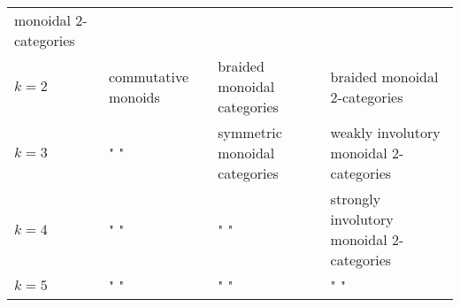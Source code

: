 \documentclass{article}
\begin{document}
\begin{longtable}[]{@{}llll@{}}
\begin{minipage}[t]{0.21\columnwidth}
monoidal 2-categories\strut
\end{minipage}\tabularnewline
\begin{minipage}[t]{0.26\columnwidth}\raggedright
\(k=2\)\strut
\end{minipage} & \begin{minipage}[t]{0.21\columnwidth}\raggedright
commutative monoids\strut
\end{minipage} & \begin{minipage}[t]{0.21\columnwidth}\raggedright
braided monoidal categories\strut
\end{minipage} & \begin{minipage}[t]{0.21\columnwidth}\raggedright
braided monoidal 2-categories\strut
\end{minipage}\tabularnewline
\begin{minipage}[t]{0.26\columnwidth}\raggedright
\(k=3\)\strut
\end{minipage} & \begin{minipage}[t]{0.21\columnwidth}\raggedright
" "\strut
\end{minipage} & \begin{minipage}[t]{0.21\columnwidth}\raggedright
symmetric monoidal categories\strut
\end{minipage} & \begin{minipage}[t]{0.21\columnwidth}\raggedright
weakly involutory monoidal 2-categories\strut
\end{minipage}\tabularnewline
\begin{minipage}[t]{0.26\columnwidth}\raggedright
\(k=4\)\strut
\end{minipage} & \begin{minipage}[t]{0.21\columnwidth}\raggedright
" "\strut
\end{minipage} & \begin{minipage}[t]{0.21\columnwidth}\raggedright
" "\strut
\end{minipage} & \begin{minipage}[t]{0.21\columnwidth}\raggedright
strongly involutory monoidal 2-categories\strut
\end{minipage}\tabularnewline
\begin{minipage}[t]{0.26\columnwidth}\raggedright
\(k=5\)\strut
\end{minipage} & \begin{minipage}[t]{0.21\columnwidth}\raggedright
" "\strut
\end{minipage} & \begin{minipage}[t]{0.21\columnwidth}\raggedright
" "\strut
\end{minipage} & \begin{minipage}[t]{0.21\columnwidth}\raggedright
" "\strut
\end{minipage}\tabularnewline
\bottomrule
\end{longtable}
\end{document}
